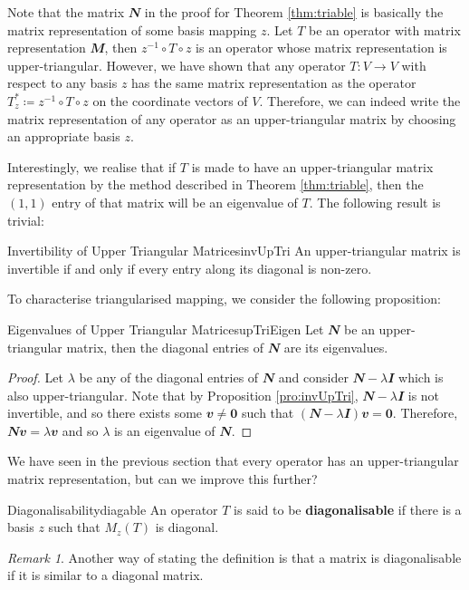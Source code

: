 \documentclass[math]{amznotes}
\theoremstyle{remark}
\newtheorem*{remark}{Remark}
\newcommand{\zero}{\mathbf{0}}
\begin{document}
Note that the matrix $\mathbfit{N}$ in the proof for Theorem \ref{thm:triable} is basically the matrix representation of some basis mapping $z$. Let $T$ be an operator with matrix representation $\mathbfit{M}$, then $z^{-1} \circ T \circ z$ is an operator whose matrix representation is upper-triangular. However, we have shown that any operator $T \colon V \to V$ with respect to any basis $z$ has the same matrix representation as the operator $T^*_z \coloneqq z^{-1} \circ T \circ z$ on the coordinate vectors of $V$. Therefore, we can indeed write the matrix representation of any operator as an upper-triangular matrix by choosing an appropriate basis $z$.

Interestingly, we realise that if $T$ is made to have an upper-triangular matrix representation by the method described in Theorem \ref{thm:triable}, then the $(1, 1)$ entry of that matrix will be an eigenvalue of $T$. The following result is trivial:
\begin{probox}{Invertibility of Upper Triangular Matrices}{invUpTri}
    An upper-triangular matrix is invertible if and only if every entry along its diagonal is non-zero.
\end{probox}
To characterise triangularised mapping, we consider the following proposition:
\begin{probox}{Eigenvalues of Upper Triangular Matrices}{upTriEigen}
    Let $\mathbfit{N}$ be an upper-triangular matrix, then the diagonal entries of $\mathbfit{N}$ are its eigenvalues.
    \tcblower
    \begin{proof}
        Let $\lambda$ be any of the diagonal entries of $\mathbfit{N}$ and consider $\mathbfit{N} - \lambda\mathbfit{I}$ which is also upper-triangular. Note that by Proposition \ref{pro:invUpTri}, $\mathbfit{N} - \lambda\mathbfit{I}$ is not invertible, and so there exists some $\mathbfit{v} \neq \zero$ such that $(\mathbfit{N} - \lambda\mathbfit{I})\mathbfit{v} = \zero$. Therefore, $\mathbfit{Nv} = \lambda\mathbfit{v}$ and so $\lambda$ is an eigenvalue of $\mathbfit{N}$.
    \end{proof}
\end{probox}
We have seen in the previous section that every operator has an upper-triangular matrix representation, but can we improve this further?
\begin{dfnbox}{Diagonalisability}{diagable}
    An operator $T$ is said to be {\color{red} \textbf{diagonalisable}} if there is a basis $z$ such that $M_z\left(T\right)$ is diagonal.
\end{dfnbox}
\begin{notebox}
    \begin{remark}
        Another way of stating the definition is that a matrix is diagonalisable if it is similar to a diagonal matrix.
    \end{remark}
\end{notebox}
\end{document}
